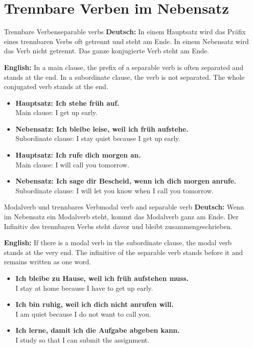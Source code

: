 \documentclass[a4paper,11pt]{article}
\newcommand{\GermanText}[1]{\textbf{Deutsch: }#1\par}
\newcommand{\EnglishText}[1]{{\small\color{SoftGray}\textbf{English: }#1\par}}
\newcommand{\ExampleItem}[2]{\item \textbf{#1}\\{\small\color{SoftGray}#2}}
\begin{document}
    \section{Trennbare Verben im Nebensatz}
        
        \begin{grammarentry}{Trennbare Verben}{separable verbs}
            \GermanText{In einem Hauptsatz wird das Präfix eines trennbaren Verbs oft getrennt und steht am Ende. In einem Nebensatz wird das Verb nicht getrennt. Das ganze konjugierte Verb steht am Ende.}
            \EnglishText{In a main clause, the prefix of a separable verb is often separated and stands at the end. In a subordinate clause, the verb is not separated. The whole conjugated verb stands at the end.}
            
            \begin{exbox}
                \begin{itemize}
                    \ExampleItem{Hauptsatz: Ich stehe früh auf.}{Main clause: I get up early.}
                    \ExampleItem{Nebensatz: Ich bleibe leise, weil ich früh aufstehe.}{Subordinate clause: I stay quiet because I get up early.}
                    \ExampleItem{Hauptsatz: Ich rufe dich morgen an.}{Main clause: I will call you tomorrow.}
                    \ExampleItem{Nebensatz: Ich sage dir Bescheid, wenn ich dich morgen anrufe.}{Subordinate clause: I will let you know when I call you tomorrow.}
                \end{itemize}
            \end{exbox}
        \end{grammarentry}
        
        \begin{grammarentry}{Modalverb und trennbares Verb}{modal verb and separable verb}
            \GermanText{Wenn im Nebensatz ein Modalverb steht, kommt das Modalverb ganz am Ende. Der Infinitiv des trennbaren Verbs steht davor und bleibt zusammengeschrieben.}
            \EnglishText{If there is a modal verb in the subordinate clause, the modal verb stands at the very end. The infinitive of the separable verb stands before it and remains written as one word.}
            
            \begin{exbox}
                \begin{itemize}
                    \ExampleItem{Ich bleibe zu Hause, weil ich früh aufstehen muss.}{I stay at home because I have to get up early.}
                    \ExampleItem{Ich bin ruhig, weil ich dich nicht anrufen will.}{I am quiet because I do not want to call you.}
                    \ExampleItem{Ich lerne, damit ich die Aufgabe abgeben kann.}{I study so that I can submit the assignment.}
                \end{itemize}
            \end{exbox}
        \end{grammarentry}
        
\end{document}
